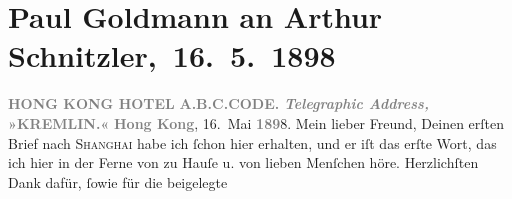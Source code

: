 

         
         \renewcommand{\erwaehntePersonen}{Personen:  ?? [Chinesischer Fotograf], Richard Beer-Hofmann, Louis Philipp Friedmann, Rose Friedmann, Hugo von Hofmannsthal, Marie Reinhard, Arthur Rosthorn, Leo Van-Jung, Alice Ziegler}
         \renewcommand{\erwaehnteInstitutionen}{Institutionen: Pun lun}
         \renewcommand{\erwaehnteOrte}{Orte: Bad Gastein, China, Deutsches Postamt in Shanghai, Deutschland, Europa, Graz, Guangzhou, Hong Kong, Hongkong Hotel, Italien, München, Peking, Prag, Salzburg, Schweiz, Shanghai, Tegernsee, Wien}
         \renewcommand{\erwaehnteWerke}{Werke: Paul Goldmann, Tagebuch}
               \section[ Paul Goldmann an Arthur Schnitzler, 16. 5. 1898]{ Paul Goldmann an Arthur Schnitzler, 16. 5. 1898}\nopagebreak{}\rehead{ }\begin{ledgroupsized}[t]{13cm}\normalsize\beginnumbering \toendnotes[C]{\smallbreak\pagebreak[2]} 
\toendnotes[C]{\smallbreak}\pstart
           \noindent{}\centering{}{\pb}\textcolor{gray}{\textbf{HONG KONG HOTEL}}\pend
           \pstart
           \noindent{}\textcolor{gray}{\textbf{\textbf{A.B.C.CODE.}}}\pend
           \pstart
           \textcolor{gray}{\textbf{\emph{Telegraphic Address,}}}\pend
           \pstart
           \textcolor{gray}{\textbf{\textbf{»KREMLIN.«}}}\pend
           \pstart
           \raggedleft{}\textcolor{gray}{\textbf{Hong Kong}},{ }16. Mai \textcolor{gray}{\textbf{189}}8.\pend
           \pstart\center{}Mein lieber Freund,\pend\pstart
           Deinen erſten Brief nach \textsc{Shanghai} habe ich ſchon hier
               erhalten, und er iſt das erſte Wort, das ich hier in der Ferne von zu Hauſe u. von
               lieben Menſchen höre. Herzlichſten Dank dafür, ſowie für die beigelegte \label{K_L02845-1v}
\end{ledgroupsized}
